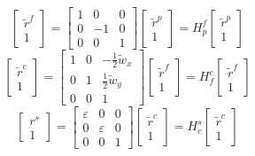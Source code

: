 \documentclass[12pt, a4paper]
{article}
\providecommand{\tr}{\tilde{r}}
\begin{document}
\begin{equation}
\begin{bmatrix}
\tr^f\\
1
\end{bmatrix} = \begin{bmatrix}
1 & 0 & 0\\
0 & -1 & 0\\
0& 0 & 1
\end{bmatrix}\begin{bmatrix}
\tr^p\\1
\end{bmatrix}=H^f_p \begin{bmatrix}
\tr^p\\1
\end{bmatrix}
\end{equation}
\begin{equation}
\begin{bmatrix}
\tr^c\\
1
\end{bmatrix} = \begin{bmatrix}
1 & 0 & -\frac{1}{2}\tilde{w}_x\\
0 & 1 & \frac{1}{2}\tilde{w}_y\\
0& 0 & 1
\end{bmatrix}\begin{bmatrix}
\tr^f\\1
\end{bmatrix}=H^c_f \begin{bmatrix}
\tr^f\\1
\end{bmatrix}
\end{equation}
\begin{equation}
\begin{bmatrix}
r^s\\
1
\end{bmatrix} = \begin{bmatrix}
\varepsilon & 0 & 0\\
0 & \varepsilon & 0\\
0& 0 & 1
\end{bmatrix}\begin{bmatrix}
\tr^c\\1
\end{bmatrix}=H^s_c \begin{bmatrix}
\tr^c\\1
\end{bmatrix}
\end{equation}
\end{document}
